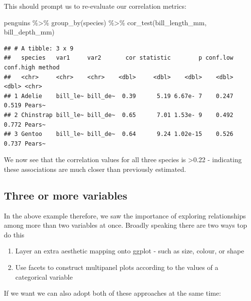 \documentclass[
]{book}
\newenvironment{Shaded}{\begin{snugshade}}{\end{snugshade}}
\newcommand{\FunctionTok}[1]{\textcolor[rgb]{0.00,0.00,0.00}{#1}}
\newcommand{\NormalTok}[1]{#1}
\newcommand{\SpecialCharTok}[1]{\textcolor[rgb]{0.00,0.00,0.00}{#1}}
\begin{document}
This should prompt us to re-evaluate our correlation metrics:

\begin{Shaded}
\begin{Highlighting}[]
\NormalTok{penguins }\SpecialCharTok{\%\textgreater{}\%} 
  \FunctionTok{group\_by}\NormalTok{(species) }\SpecialCharTok{\%\textgreater{}\%} 
  \FunctionTok{cor\_test}\NormalTok{(bill\_length\_mm, bill\_depth\_mm)}
\end{Highlighting}
\end{Shaded}

\begin{verbatim}
## # A tibble: 3 x 9
##   species   var1     var2       cor statistic        p conf.low conf.high method
##   <chr>     <chr>    <chr>    <dbl>     <dbl>    <dbl>    <dbl>     <dbl> <chr> 
## 1 Adelie    bill_le~ bill_de~  0.39      5.19 6.67e- 7    0.247     0.519 Pears~
## 2 Chinstrap bill_le~ bill_de~  0.65      7.01 1.53e- 9    0.492     0.772 Pears~
## 3 Gentoo    bill_le~ bill_de~  0.64      9.24 1.02e-15    0.526     0.737 Pears~
\end{verbatim}

We now see that the correlation values for all three species is \textgreater0.22 - indicating these associations are much closer than previously estimated.

\hypertarget{three-or-more-variables}{%
\subsection{Three or more variables}\label{three-or-more-variables}}

In the above example therefore, we saw the importance of exploring relationships among more than two variables at once. Broadly speaking there are two ways top do this

\begin{enumerate}
\def\labelenumi{\arabic{enumi}.}
\item
  Layer an extra aesthetic mapping onto ggplot - such as size, colour, or shape
\item
  Use facets to construct multipanel plots according to the values of a categorical variable
\end{enumerate}

If we want we can also adopt both of these approaches at the same time:
\end{document}
